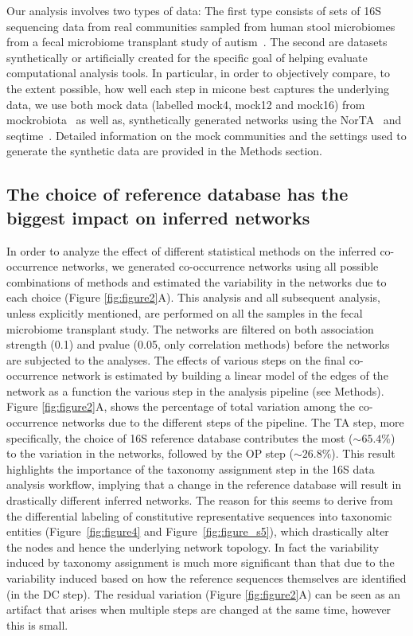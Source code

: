   Our analysis involves two types of data: The first type consists of sets of 16S sequencing data from real communities sampled from human stool microbiomes from a fecal microbiome transplant study of autism~\cite{Kang2017}.
  The second are datasets synthetically or artificially created for the specific goal of helping evaluate computational analysis tools.
  In particular, in order to objectively compare, to the extent possible, how well each step in \ac{micone} best captures the underlying data, we use both mock data (labelled mock4, mock12 and mock16) from mockrobiota~\cite{Bokulich2016} as well as, synthetically generated networks using the NorTA~\cite{Kurtz2015} and seqtime~\cite{Rottjers2018}.
  Detailed information on the mock communities and the settings used to generate the synthetic data are provided in the Methods section.

  \FloatBarrier

  \subsection*{The choice of reference database has the biggest impact on inferred networks}

  In order to analyze the effect of different statistical methods on the inferred co-occurrence networks, we generated co-occurrence networks using all possible combinations of methods and estimated the variability in the networks due to each choice (Figure \ref{fig:figure2}A).
  This analysis and all subsequent analysis, unless explicitly mentioned, are performed on all the samples in the fecal microbiome transplant study.
  The networks are filtered on both association strength (0.1) and pvalue (0.05, only correlation methods) before the networks are subjected to the analyses.
  The effects of various steps on the final co-occurrence network is estimated by building a linear model of the edges of the network as a function the various step in the analysis pipeline (see Methods).
  Figure \ref{fig:figure2}A, shows the percentage of total variation among the co-occurrence networks due to the different steps of the pipeline.
  The TA step, more specifically, the choice of 16S reference database contributes the most ($\sim65.4\%$) to the variation in the networks, followed by the OP step ($\sim26.8\%$).
  This result highlights the importance of the taxonomy assignment step in the 16S data analysis workflow, implying that a change in the reference database will result in drastically different inferred networks.
  The reason for this seems to derive from the differential labeling of constitutive representative sequences into taxonomic entities (Figure~\ref{fig:figure4} and Figure~\ref{fig:figure_s5}), which drastically alter the nodes and hence the underlying network topology.
  In fact the variability induced by taxonomy assignment is much more significant than that due to the variability induced based on how the reference sequences themselves are identified (in the DC step).
  The residual variation (Figure \ref{fig:figure2}A) can be seen as an artifact that arises when multiple steps are changed at the same time, however this is small.

